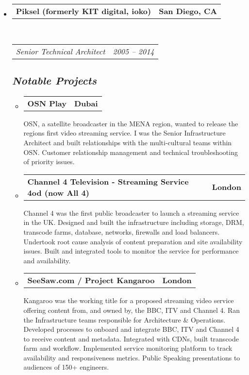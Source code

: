 \documentclass[10pt,a4paper]{article}
\makeatletter
\newcommand{\headerrow}[2]
{\begin{tabular*}{\linewidth}{l@{\extracolsep{\fill}}r}
	#1 &
	#2 \\
\end{tabular*}}
\makeatother
\begin{document}
\begin{itemize}
	\item
	\headerrow
		{\textbf{Piksel (formerly KIT digital, ioko)}}
		{\textbf{San Diego, CA}}
	\\
	\headerrow
		{\emph{Senior Technical Architect}}
		{\emph{2005 -- 2014}}
		\subsection*{\emph{Notable Projects}}
        \begin{itemize}
          \item
          \headerrow
              {\textbf{OSN Play}}
              {\textbf{Dubai}}
              OSN, a satellite broadcaster in the MENA region, wanted to release the regions first video streaming service. I was the Senior Infrastructure Architect and built relationships with the  multi-cultural teams within OSN.  Customer relationship management and technical troubleshooting of priority issues.

					\item
          \headerrow
              {\textbf{Channel 4 Television - Streaming Service 4od (now All 4)}}
              {\textbf{London}}
              Channel 4 was the first public broadcaster to launch a streaming service in the UK.  Designed and built the  infrastructure including storage, DRM, transcode farms, database, networks, firewalls and load balancers. Undertook root cause analysis of content preparation and site availability issues.  Built and integrated tools to monitor the service for performance and availability.

					\item
          \headerrow
              {\textbf{SeeSaw.com / Project Kangaroo}}
              {\textbf{London}}
              Kangaroo was the working title for a proposed streaming video service offering content from, and owned by, the BBC, ITV and Channel 4. Ran the Infrastructure teams responsible for Architecture \& Operations. Developed processes to onboard and integrate BBC, ITV and Channel 4 to receive content and metadata. Integrated with CDNs, built transcode farm and workflow. Implemented service monitoring platform to track availability and responsiveness metrics.  Public Speaking presentations to audiences of 150+ engineers.


\end{itemize}
\end{itemize}
\end{document}

